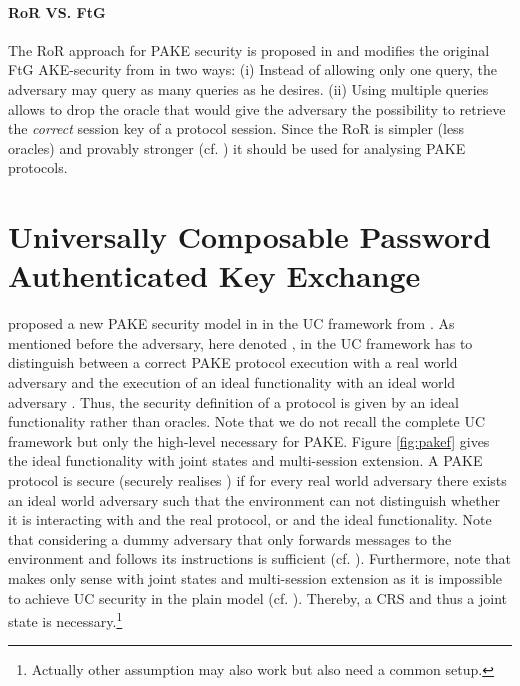 \paragraph{RoR VS. FtG}
The \acl{RoR} approach for \ac{PAKE} security is proposed in \cite{Abdalla2005} and modifies the original \acl{FtG} \ac{AKE}-security from \cite{Bellare2000} in two ways:
(i) Instead of allowing only one \Test query, the adversary may query as many \Test queries as he desires.
(ii) Using multiple \Test queries allows to drop the \Reveal oracle that would give the adversary the possibility to retrieve the \emph{correct} session key of a protocol session.
Since the \ac{RoR} is simpler (less oracles) and provably stronger (cf. \cite[Lemma 2, Proposition 1]{Abdalla2005}) it should be used for analysing \ac{PAKE} protocols.

\section{Universally Composable Password Authenticated Key Exchange} \label{sec:ucpake}
\citeauthor{Canetti2005} proposed a new \ac{PAKE} security model in \cite{Canetti2005} in the \acl{UC} framework from \cite{Canetti2001a}.
As mentioned before the adversary, here denoted \cZ, in the \ac{UC} framework has to distinguish between a correct \ac{PAKE} protocol execution with a real world adversary \cA and the execution of an ideal functionality \cF with an ideal world adversary \cS.
Thus, the security definition of a protocol is given by an ideal functionality rather than oracles.
Note that we do not recall the complete \ac{UC} framework but only the high-level necessary for \ac{PAKE}.
Figure \ref{fig:pakef} gives the ideal functionality \cFPAKE with joint states and multi-session extension.
A \ac{PAKE} protocol is secure (securely realises \cFPAKE) if for every real world adversary \cA there exists an ideal world adversary \cS such that the environment \cZ can not distinguish whether it is interacting with \cA and the real protocol, or \cS and the ideal functionality.
Note that considering a dummy adversary \cA that only forwards messages to the environment and follows its instructions is sufficient (cf. \cite{Canetti2001a}).
Furthermore, note that \cFPAKE makes only sense with joint states and multi-session extension as it is impossible to achieve \ac{UC} security in the plain model (cf. \cite[Section 4]{Canetti2005}).
Thereby, a \ac{CRS} and thus a joint state is necessary.\footnote{Actually other assumption may also work but also need a common setup.}

